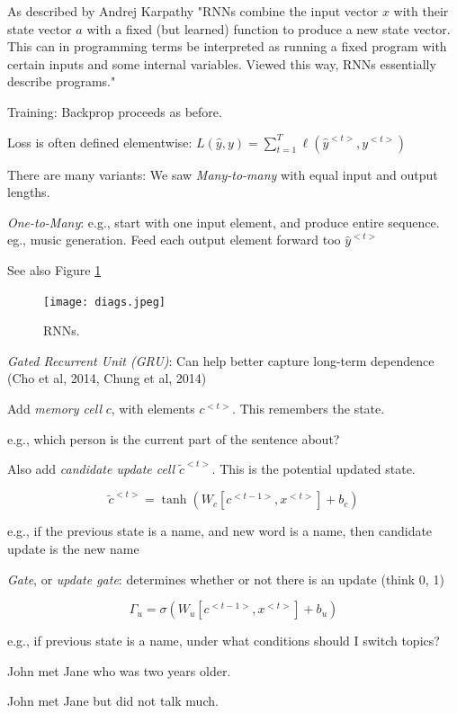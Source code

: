 \documentclass[english]{article}
\begin{document}
As described by Andrej Karpathy "RNNs combine the input vector $x$ with their state vector $a$ with a fixed (but learned) function to produce a new state vector. This can in programming terms be interpreted as running a fixed program with certain inputs and some internal variables. Viewed this way, RNNs essentially describe programs."

\eenum 
\item Training: Backprop proceeds as before. 

Loss is often defined elementwise: $L(\hat y,y) = \sum_{t=1}^T \ell(\hat y^{<t>},y^{<t>})$


\item There are many variants: We saw \emph{Many-to-many} with equal input and output lengths. 

\emph{One-to-Many}: e.g., start with one input element, and produce entire sequence. eg., music generation. Feed each output element forward too $\hat y^{<t>}$

 See also Figure \ref{rnn}

\begin{figure}
  \centering
  \texttt{[image: diags.jpeg]}
  \caption{RNNs.}
  \label{rnn}
\end{figure}


\item \emph{Gated Recurrent Unit (GRU)}: Can help better capture long-term dependence (Cho et al, 2014, Chung et al, 2014) 

Add \emph{memory cell} $c$, with elements $c^{<t>}$. This remembers the state.

e.g., which person is the current part of the sentence about?


Also add \emph{candidate update cell} $\tilde c^{<t>}$. This is the potential updated state. 

$$\tilde c^{<t>} = \tanh(W_c [c^{<t-1>},x^{<t>}]+b_c)$$

e.g., if the previous state is a name, and new word is a name, then candidate update is the new name

\emph{Gate}, or \emph{update gate}: determines whether or not there is an update (think 0, 1)

$$\Gamma_u = \sigma(W_u [c^{<t-1>},x^{<t>}]+b_u)$$

e.g., if previous state is a name, under what conditions should I switch topics? 

\benum 
\item John met Jane who was two years older. 
\item John met Jane but did not talk much.
\eenum 
\end{document}

